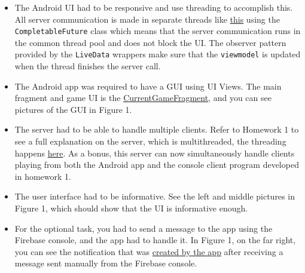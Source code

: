 \documentclass[a4paper]{scrartcl}
\def\code#1{\texttt{#1}}
\begin{document}
\begin{itemize}
    \item The Android UI had to be responsive and use threading to accomplish this. All server communication is made in separate threads like \href{https://github.com/fongie/AndroidHangman/blob/master/app/src/main/java/se/kth/korlinge/androidhangman/repository/GameRepository.java#L38}{this} using the \code{CompletableFuture} class which means that the server communication runs in the common thread pool and does not block the UI. The observer pattern provided by the \code{LiveData} wrappers make sure that the \code{viewmodel} is updated when the thread finishes the server call.

    \item The Android app was required to have a GUI using UI Views. The main fragment and game UI is the \href{https://github.com/fongie/AndroidHangman/blob/master/app/src/main/java/se/kth/korlinge/androidhangman/view/CurrentGameFragment.java}{CurrentGameFragment}, and you can see pictures of the GUI in Figure 1.

    \item The server had to be able to handle multiple clients. Refer to Homework 1 to see a full explanation on the server, which is multithreaded, the threading happens \href{https://github.com/fongie/Hangman/blob/master/hangmanserver/src/main/java/net/Server.java#L53}{here}. As a bonus, this server can now simultaneously handle clients playing from both the Android app and the console client program developed in homework 1.
        
    \item The user interface had to be informative. See the left and middle pictures in Figure 1, which should show that the UI is informative enough.

    \item For the optional task, you had to send a message to the app using the Firebase console, and the app had to handle it. In Figure 1, on the far right, you can see the notification that was \href{https://github.com/fongie/AndroidHangman/blob/master/app/src/main/java/se/kth/korlinge/androidhangman/integration/MyFirebaseMessagingService.java#L31}{created by the app} after receiving a message sent manually from the Firebase console.

\end{itemize}
\end{document}
